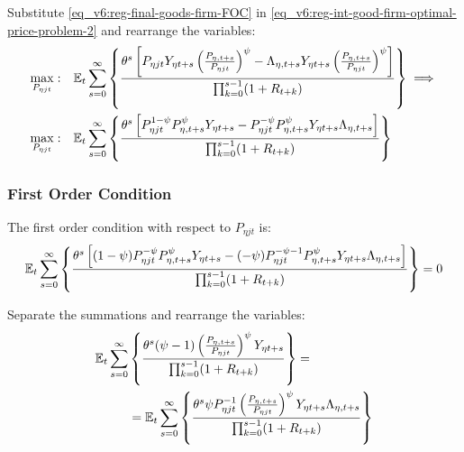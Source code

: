 \documentclass[../thesis.tex]{subfiles}
\begin{document}
Substitute \ref{eq_v6:reg-final-goods-firm-FOC} in \ref{eq_v6:reg-int-good-firm-optimal-price-problem-2} and rearrange the variables:
\begin{align}
	\max_{P_{\eta jt}}: & \quad {\mathbb{E}_{t}} \sum_{s=0}^{\infty} \left\{ \frac{\theta^s \left[ P_{\eta jt} Y_{\eta t+s} \left( \frac{P_{\eta, t+s}}{P_{\eta jt}} \right)^{\psi} - \Lambda_{\eta, t+s} Y_{\eta t+s} \left( \frac{P_{\eta, t+s}}{P_{\eta jt}} \right)^{\psi} \right]}{\prod_{k=0}^{s-1}(1+R_{t+k})} \right\} \implies \nonumber 
	\\
	\max_{P_{\eta jt}}: & \quad {\mathbb{E}_{t}} \sum_{s=0}^{\infty} \left\{ \frac{\theta^s \left[ P_{\eta jt}^{1-\psi} P_{\eta, t+s}^{\psi} Y_{\eta t+s} - P_{\eta jt}^{-\psi} P_{\eta, t+s}^{\psi} Y_{\eta t+s} \Lambda_{\eta, t+s} \right]}{\prod_{k=0}^{s-1}(1+R_{t+k})} \right\} \nonumber
\end{align}


\subsubsection*{First Order Condition}

The first order condition with respect to $P_{\eta jt}$ is:
\begin{align}
	& \quad {\mathbb{E}_{t}} \sum_{s=0}^{\infty} \left\{ \frac{\theta^s \left[ (1-\psi) P_{\eta jt}^{-\psi} P_{\eta, t+s}^{\psi} Y_{\eta t+s} - (-\psi) P_{\eta jt}^{-\psi-1} P_{\eta, t+s}^{\psi} Y_{\eta t+s} \Lambda_{\eta, t+s} \right]}{\prod_{k=0}^{s-1}(1+R_{t+k})} \right\} = 0 \nonumber
\end{align}


Separate the summations and rearrange the variables:
\begin{align}
	\begin{split}
		{\mathbb{E}_{t}} \sum_{s=0}^{\infty} &\left\{ \frac{\theta^s (\psi-1) \left( \frac{P_{\eta, t+s}} {P_{\eta jt}} \right)^{\psi} Y_{\eta t+s}} {\prod_{k=0}^{s-1} (1+R_{t+k})} \right\} = \\
		&= {\mathbb{E}_{t}} \sum_{s=0}^{\infty} \left\{ \frac{\theta^s \psi P_{\eta jt}^{-1} \left( \frac{P_{\eta, t+s}} {P_{\eta jt}} \right)^{\psi} Y_{\eta t+s} \Lambda_{\eta, t+s}}{\prod_{k=0}^{s-1}(1+R_{t+k})} \right\} \label{eq_v6:reg-int-good-firm-optimal-price-FOC}
	\end{split}
\end{align}

\end{document}

